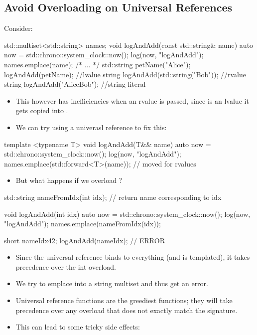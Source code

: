 \subsection{Avoid Overloading on Universal References}
Consider:
\begin{cppcode}
std::multiset<std::string> names;
void logAndAdd(const std::string& name) {
  auto now = std::chrono::system_clock::now();
  log(now, "logAndAdd");
  names.emplace(name);
}
/* ... */
std::string petName("Alice");
logAndAdd(petName); //lvalue string
logAndAdd(std::string("Bob")); //rvalue string
logAndAdd("AliceBob"); //string literal
\end{cppcode}
\begin{itemize}
  \item This however has inefficiencies when an rvalue is passed, since  is an lvalue it gets copied into . 
  \item We can try using a univerasl reference to fix this:
\end{itemize}
\begin{cppcode}
template <typename T>
void logAndAdd(T&& name) {
  auto now = std::chrono::system_clock::now();
  log(now, "logAndAdd");
  names.emplace(std::forward<T>(name)); // moved for rvalues
}
\end{cppcode}
\begin{itemize}
  \item But what happens if we overload ?
\end{itemize}
\begin{cppcode}
std::string nameFromIdx(int idx); // return name corresponding to idx

void logAndAdd(int idx)  {
  auto now = std::chrono::system_clock::now();
  log(now, "logAndAdd");
  names.emplace(nameFromIdx(idx));
}

short nameIdx{42};
logAndAdd(nameIdx); // ERROR
\end{cppcode}
\begin{itemize}
  \item Since the universal reference binds to everything (and is templated), it takes precedence over the int overload.
  \item We try to emplace into a string multiset and thus get an error.
  \item Universal reference functions are the greediest functions; they will take precedence over any overload that does not exactly match the signature.
  \item This can lead to some tricky side effects:
\end{itemize}
